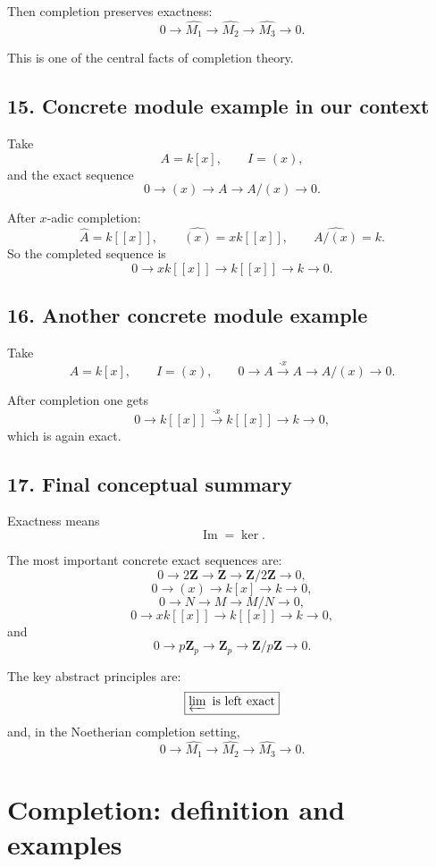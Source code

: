 \documentclass[12pt,a4paper]{article}
\theoremstyle{plain}
\theoremstyle{definition}      %
\begin{document}
	Then completion preserves exactness:
	\[
	0\to \widehat{M_1}\to \widehat{M_2}\to \widehat{M_3}\to 0.
	\]
	
	This is one of the central facts of completion theory.
	
	\subsection*{15. Concrete module example in our context}
	
	Take
	\[
	A=k[x],\qquad I=(x),
	\]
	and the exact sequence
	\[
	0\to (x)\to A\to A/(x)\to 0.
	\]
	
	After \(x\)-adic completion:
	\[
	\widehat A = k[[x]],
	\qquad
	\widehat{(x)} = xk[[x]],
	\qquad
	\widehat{A/(x)} = k.
	\]
	So the completed sequence is
	\[
	0\to xk[[x]]\to k[[x]]\to k\to 0.
	\]
	
	\subsection*{16. Another concrete module example}
	
	Take
	\[
	A=k[x],\qquad I=(x),
	\qquad
	0\to A\xrightarrow{\cdot x} A\to A/(x)\to 0.
	\]
	
	After completion one gets
	\[
	0\to k[[x]]\xrightarrow{\cdot x} k[[x]]\to k\to 0,
	\]
	which is again exact.
	
	\subsection*{17. Final conceptual summary}
	
	Exactness means
	\[
	\operatorname{Im}=\ker.
	\]
	
	The most important concrete exact sequences are:
	\[
	0\to 2\mathbf Z\to \mathbf Z\to \mathbf Z/2\mathbf Z\to 0,
	\]
	\[
	0\to (x)\to k[x]\to k\to 0,
	\]
	\[
	0\to N\to M\to M/N\to 0,
	\]
	\[
	0\to xk[[x]]\to k[[x]]\to k\to 0,
	\]
	and
	\[
	0\to p\mathbf Z_p\to \mathbf Z_p\to \mathbf Z/p\mathbf Z\to 0.
	\]
	
	The key abstract principles are:
	\[
	\boxed{\varprojlim \text{ is left exact}}
	\]
	and, in the Noetherian completion setting,
	\[
	\boxed{0\to \widehat{M_1}\to \widehat{M_2}\to \widehat{M_3}\to 0.}
	\]
	
	\section*{Completion: definition and examples}
	
\end{document}
